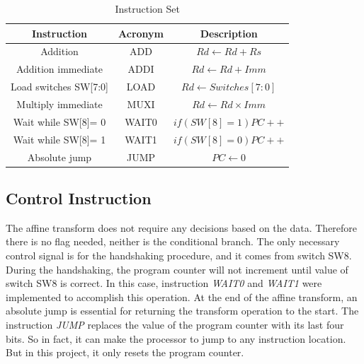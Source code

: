 \begin{table}[H]

\centering %
\begin{tabular}{c c c } %
\hline\hline %
Instruction                 & Acronym     & Description \\ [0.5ex] %
\hline %
Addition                    & ADD         & \(Rd \leftarrow Rd + Rs \)  \\
Addition immediate          & ADDI        & \(Rd \leftarrow Rd + Imm\)      \\
Load switches SW[7:0]       & LOAD        & \(Rd \leftarrow Switches[7:0]\)      \\
Multiply immediate          & MUXI        & \(Rd \leftarrow Rd \times Imm\)      \\
Wait while SW[8]= 0         & WAIT0       & \(if(SW[8] = 1) PC++     \)          \\
Wait while SW[8]= 1         & WAIT1       & \(if(SW[8] = 0) PC++  \)         \\
Absolute jump               & JUMP        & \(PC \leftarrow 0  \)             \\ [1ex] %
\hline %
\end{tabular}
\caption{Instruction Set} %
\label{table:instr} %
\end{table}

\subsection{Control Instruction} \label{SubSection:Control Instruction}

The affine transform does not require any decisions based on the data. Therefore there is no flag needed, neither is the conditional branch. The only necessary control signal is for the handshaking procedure, and it comes from switch SW8. During the handshaking, the program counter will not increment until value of switch SW8 is correct. In this case, instruction \textit{WAIT0} and \textit{WAIT1} were implemented to accomplish this operation. At the end of the affine transform, an absolute jump is essential for returning the transform operation to the start. The instruction \textit{JUMP} replaces the value of the program counter with its last four bits. So in fact, it can make the processor to jump to any instruction location. But in this project, it only resets the program counter. 

